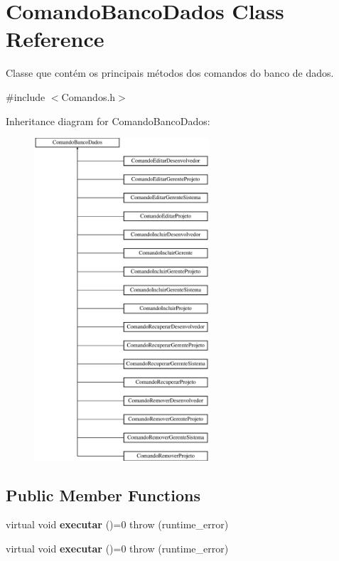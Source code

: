 \hypertarget{class_comando_banco_dados}{}\section{Comando\+Banco\+Dados Class Reference}
\label{class_comando_banco_dados}


Classe que contém os principais métodos dos comandos do banco de dados.  




{\ttfamily \#include $<$Comandos.\+h$>$}

Inheritance diagram for Comando\+Banco\+Dados\+:\begin{figure}[H]
\begin{center}
\leavevmode
\includegraphics[height=12.000000cm]{class_comando_banco_dados}
\end{center}
\end{figure}
\subsection*{Public Member Functions}
\begin{DoxyCompactItemize}
\item 
\hypertarget{class_comando_banco_dados_a4f71e8d9f2b3e997645bc356a5473433}{}\label{class_comando_banco_dados_a4f71e8d9f2b3e997645bc356a5473433} 
virtual void {\bfseries executar} ()=0  throw (runtime\+\_\+error)
\item 
\hypertarget{class_comando_banco_dados_a4f71e8d9f2b3e997645bc356a5473433}{}\label{class_comando_banco_dados_a4f71e8d9f2b3e997645bc356a5473433} 
virtual void {\bfseries executar} ()=0  throw (runtime\+\_\+error)
\end{DoxyCompactItemize}


